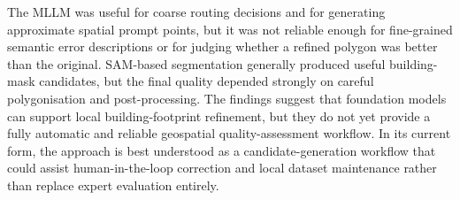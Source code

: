 The MLLM was useful for coarse routing decisions and for generating approximate spatial prompt points, but it was not reliable enough for fine-grained semantic error descriptions or for judging whether a refined polygon was better than the original. SAM-based segmentation generally produced useful building-mask candidates, but the final quality depended strongly on careful polygonisation and post-processing. The findings suggest that foundation models can support local building-footprint refinement, but they do not yet provide a fully automatic and reliable geospatial quality-assessment workflow. In its current form, the approach is best understood as a candidate-generation workflow that could assist human-in-the-loop correction and local dataset maintenance rather than replace expert evaluation entirely.
